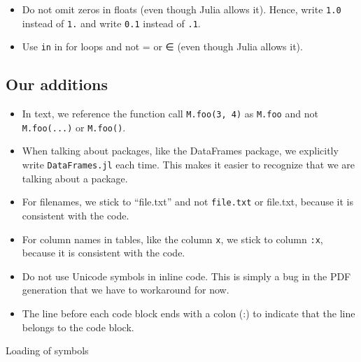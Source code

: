 \documentclass[
  notoc %
]{tufte-book}
\makeatletter
\providecommand{\tightlist}{%
  \setlength{\itemsep}{0pt}\setlength{\parskip}{0pt}
}
\newcommand{\passthrough}[1]{#1}
\renewcommand\subsubsection{%
\@startsection{subsubsection}{3}{\z@ }{-3.25ex\@plus -1ex \@minus -.2ex}{1.5ex \@plus .2ex}{\normalfont \normalsize \bfseries }
}
\makeatother
\begin{document}
\begin{itemize}
\begin{lstlisting}
s = """
    my long text:
    [...]
    the end.
    """
\end{lstlisting}
\item
  Do not omit zeros in floats (even though Julia allows it). Hence,
  write \passthrough{\lstinline!1.0!} instead of
  \passthrough{\lstinline!1.!} and write \passthrough{\lstinline!0.1!}
  instead of \passthrough{\lstinline!.1!}.
\item
  Use \passthrough{\lstinline!in!} in for loops and not = or ∈ (even
  though Julia allows it).
\end{itemize}

\hypertarget{our-additions}{%
\subsection{Our additions}\label{our-additions}}

\begin{itemize}
\tightlist
\item
  In text, we reference the function call
  \passthrough{\lstinline!M.foo(3, 4)!} as
  \passthrough{\lstinline!M.foo!} and not
  \passthrough{\lstinline!M.foo(...)!} or
  \passthrough{\lstinline!M.foo()!}.
\item
  When talking about packages, like the DataFrames package, we
  explicitly write \passthrough{\lstinline!DataFrames.jl!} each time.
  This makes it easier to recognize that we are talking about a package.
\item
  For filenames, we stick to ``file.txt'' and not
  \passthrough{\lstinline!file.txt!} or file.txt, because it is
  consistent with the code.
\item
  For column names in tables, like the column
  \passthrough{\lstinline!x!}, we stick to column
  \passthrough{\lstinline!:x!}, because it is consistent with the code.
\item
  Do not use Unicode symbols in inline code. This is simply a bug in the
  PDF generation that we have to workaround for now.
\item
  The line before each code block ends with a colon (:) to indicate that
  the line belongs to the code block.
\end{itemize}

\hypertarget{loading-of-symbols}{%
\subsubsection{Loading of symbols}\label{loading-of-symbols}}
\end{document}
